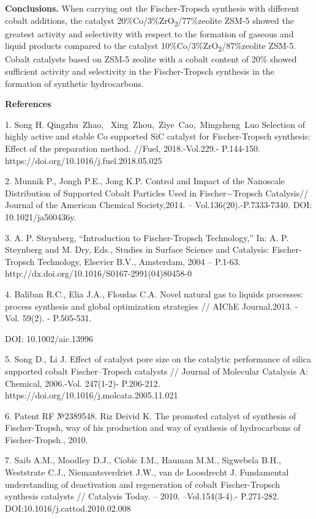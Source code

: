 {\bfseries Conclusions.} When carrying out the Fischer-Tropsch synthesis
with different cobalt additions, the catalyst
20\%Co/3\%ZrO\textsubscript{2}/77\%zeolite ZSM-5 showed the greatest
activity and selectivity with respect to the formation of gaseous and
liquid products compared to the catalyst
10\%Co/3\%ZrO\textsubscript{2}/87\%zeolite ZSM-5. Cobalt catalysts based
on ZSM˗5 zeolite with a cobalt content of 20\% showed sufficient
activity and selectivity in the Fischer-Tropsch synthesis in the
formation of synthetic hydrocarbons.

{\bfseries References}

1. Song H. Qingzhu~Zhao,~ Xing~Zhou,~Ziye~Cao,~Mingsheng~Luo Selection
of highly active and stable Co supported SiC catalyst for
Fischer-Tropsch synthesis: Effect of the preparation method. //Fuel,
2018.-Vol.229.- P.144-150. https://doi.org/10.1016/j.fuel.2018.05.025

2. Munnik P., Jongh P.E., Jong K.P. Control and Impact of the Nanoscale
Distribution of Supported Cobalt Particles Used in Fischer−Tropsch
Catalysis// Journal of the American Chemical Society,2014. --
Vol.136(20).-P.7333-7340. DOI: 10.1021/ja500436y.~

3. A. P. Steynberg, ``Introduction to Fischer-Tropsch Technology,'' In:
A. P. Steynberg and M. Dry, Eds., Studies in Surface Science and
Catalysis: Fischer-Tropsch Technology, Elsevier B.V., Amsterdam, 2004 --
P.1-63. http://dx.doi.org/10.1016/S0167-2991(04)80458-0

4. Baliban R.C., Elia J.A., Floudas C.A. Novel natural gas to liquids
processes: process synthesis and global optimization strategies // AIChE
Journal,2013. - Vol. 59(2). - P.505-531.

DOI: 10.1002/aic.13996

5. Song D., Li J. Effect of catalyst pore size on the catalytic
performance of silica supported cobalt Fischer--Tropsch catalysts //
Journal of Molecular Catalysis A: Chemical, 2006.-Vol. 247(1-2)-
P.206-212. https://doi.org/10.1016/j.molcata.2005.11.021

6. Patent RF №2389548. Riz Deivid K. The promoted catalyst of synthesis
of Fischer-Tropsh, way of his production and way of synthesis of
hydrocarbons of Fischer-Tropsh., 2010.

7. Saib A.M., Moodley D.J., Ciobic I.M., Hauman M.M., Sigwebela B.H.,
Weststrate C.J., Niemantsverdriet J.W., van de Loosdrecht J. Fundamental
understanding of deactivation and regeneration of cobalt Fischer-Tropsch
synthesis catalysts // Catalysis Today. -- 2010. --Vol.154(3-4).-
P.271-282. DOI:10.1016/j.cattod.2010.02.008

